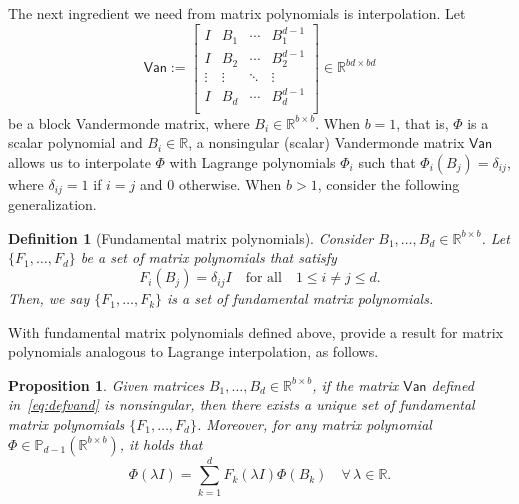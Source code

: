 \documentclass{article}
\newtheorem{proposition}{Proposition}%
\newtheorem{definition}{Definition}
\newcommand{\defi}{:=}
\newcommand{\van}{\mathsf{Van}}
\newcommand{\poly}{\mathbb{P}}
\newcommand{\fp}{F}
\newcommand{\R}{\mathbb{R}}
\begin{document}
The next ingredient we need from matrix polynomials is interpolation. Let 
\begin{equation}
    \label{eq:defvand}
    \van \defi 
    \begin{bmatrix}
        I & B_{1} & \cdots & B_{1}^{d-1}\\ 
        I & B_{2} & \cdots & B_{2}^{d-1}\\ 
        \vdots & \vdots & \ddots & \vdots \\ 
        I & B_{d} & \cdots & B_{d}^{d-1}\\ 
    \end{bmatrix}\in\R^{bd\times bd}
\end{equation}
be a block Vandermonde matrix, where $B_{i}\in\R^{b\times b}$. When $b=1$, that is, $\Phi$ is a scalar polynomial and $B_{i}\in\R$, a nonsingular (scalar) Vandermonde matrix $\van$ allows us to interpolate $\Phi$ with Lagrange polynomials $\Phi_{i}$  such that $\Phi_{i}(B_{j})=\delta_{ij}$, where $\delta_{ij}=1$ if $i=j$ and $0$ otherwise. When $b>1$, consider the following generalization.

\begin{definition}[Fundamental matrix polynomials]
    \label{def:fp}
    Consider $B_{1},\dotsc,B_{d}\in\R^{b\times b}$. Let $\{\fp_{1},\dotsc,\fp_{d}\}$ be a set of matrix polynomials that satisfy 
    \begin{equation*}
        \fp_{i}(B_{j}) =  \delta_{ij} I \quad\text{for all}\quad  1\leq i\neq j\leq d.
    \end{equation*}
    Then, we say $\{\fp_{1},\dotsc,\fp_{k}\}$ is a set of fundamental matrix polynomials. 
\end{definition}


With fundamental matrix polynomials defined above, \cite[Thm.~5.2 and Cor.~5.1]{Dennis1976}
provide a result for matrix polynomials analogous to Lagrange interpolation, as follows.
\begin{proposition}
    \label{prop:interpolation}
    Given matrices $B_{1},\dotsc,B_{d}\in\R^{b\times b}$, if the matrix $\van$ defined in~\cref{eq:defvand} is nonsingular, then there exists a unique set of fundamental matrix polynomials $\{\fp_{1},\dotsc,\fp_{d}\}$. Moreover, for any matrix polynomial $\Phi\in\poly_{d-1}(\R^{b\times b})$, it holds that  
    \begin{equation*}
        \Phi(\lambda I) = \sum_{k=1}^{d} \fp_{k}(\lambda I)\Phi(B_{k})\quad \forall\, \lambda\in\R.
    \end{equation*}
\end{proposition}
\end{document}
